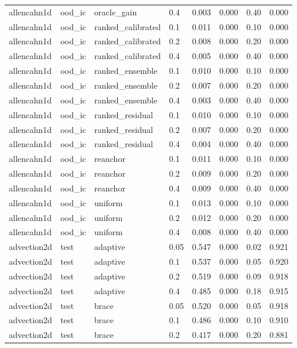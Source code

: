 \begin{longtable}{llllrrrr}
allencahn1d & ood\_ic & oracle\_gain & 0.4 & 0.003 & 0.000 & 0.40 & 0.000 \\
allencahn1d & ood\_ic & ranked\_calibrated & 0.1 & 0.011 & 0.000 & 0.10 & 0.000 \\
allencahn1d & ood\_ic & ranked\_calibrated & 0.2 & 0.008 & 0.000 & 0.20 & 0.000 \\
allencahn1d & ood\_ic & ranked\_calibrated & 0.4 & 0.005 & 0.000 & 0.40 & 0.000 \\
allencahn1d & ood\_ic & ranked\_ensemble & 0.1 & 0.010 & 0.000 & 0.10 & 0.000 \\
allencahn1d & ood\_ic & ranked\_ensemble & 0.2 & 0.007 & 0.000 & 0.20 & 0.000 \\
allencahn1d & ood\_ic & ranked\_ensemble & 0.4 & 0.003 & 0.000 & 0.40 & 0.000 \\
allencahn1d & ood\_ic & ranked\_residual & 0.1 & 0.010 & 0.000 & 0.10 & 0.000 \\
allencahn1d & ood\_ic & ranked\_residual & 0.2 & 0.007 & 0.000 & 0.20 & 0.000 \\
allencahn1d & ood\_ic & ranked\_residual & 0.4 & 0.004 & 0.000 & 0.40 & 0.000 \\
allencahn1d & ood\_ic & reanchor & 0.1 & 0.011 & 0.000 & 0.10 & 0.000 \\
allencahn1d & ood\_ic & reanchor & 0.2 & 0.009 & 0.000 & 0.20 & 0.000 \\
allencahn1d & ood\_ic & reanchor & 0.4 & 0.009 & 0.000 & 0.40 & 0.000 \\
allencahn1d & ood\_ic & uniform & 0.1 & 0.013 & 0.000 & 0.10 & 0.000 \\
allencahn1d & ood\_ic & uniform & 0.2 & 0.012 & 0.000 & 0.20 & 0.000 \\
allencahn1d & ood\_ic & uniform & 0.4 & 0.008 & 0.000 & 0.40 & 0.000 \\
\midrule
advection2d & test & adaptive & 0.05 & 0.547 & 0.000 & 0.02 & 0.921 \\
advection2d & test & adaptive & 0.1 & 0.537 & 0.000 & 0.05 & 0.920 \\
advection2d & test & adaptive & 0.2 & 0.519 & 0.000 & 0.09 & 0.918 \\
advection2d & test & adaptive & 0.4 & 0.485 & 0.000 & 0.18 & 0.915 \\
advection2d & test & brace & 0.05 & 0.520 & 0.000 & 0.05 & 0.918 \\
advection2d & test & brace & 0.1 & 0.486 & 0.000 & 0.10 & 0.910 \\
advection2d & test & brace & 0.2 & 0.417 & 0.000 & 0.20 & 0.881 \\

\end{longtable}
